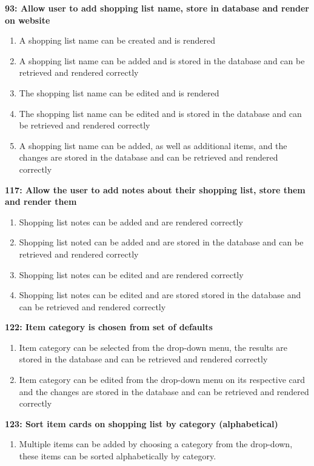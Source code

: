 \documentclass[10pt,onecolumn]{witseiepaper}
\begin{document}
\textbf{93: Allow user to add shopping list name, store in database and render on website}

\begin{enumerate}
	\item A shopping list name can be created and is rendered
	\item A shopping list name can be added and is stored in the database and can be retrieved and rendered correctly
	\item The shopping list name can be edited and is rendered
	\item The shopping list name can be edited and is stored in the database and can be retrieved and rendered correctly
	\item  A shopping list name can be added, as well as additional items, and the changes are stored in the database and can be retrieved and rendered correctly
\end{enumerate}

\textbf{117: Allow the user to add notes about their shopping list, store them and render them}

\begin{enumerate}
	\item Shopping list notes can be added and are rendered correctly
	\item Shopping list noted can be added and are stored in the database and can be retrieved and rendered correctly
	\item Shopping list notes can be edited and are rendered correctly
	\item Shopping list notes can be edited and are stored stored in the database and can be retrieved and rendered correctly
\end{enumerate}

\textbf{122: Item category is chosen from set of defaults}

\begin{enumerate}
	\item Item category can be selected from the drop-down menu, the results are stored in the database and can be retrieved and rendered correctly
	\item Item category can be edited from the drop-down menu on its respective card and the changes are stored in the database and can be retrieved and rendered correctly
\end{enumerate}

\textbf{123: Sort item cards on shopping list by category (alphabetical)}

\begin{enumerate}
	\item Multiple items can be added by choosing a category from the drop-down, these items can be sorted alphabetically by category.
\end{enumerate}
\end{document}
